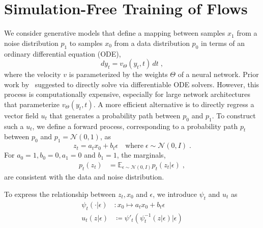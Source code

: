 \section{Simulation-Free Training of Flows}
\label{sec:method}

%
%
%
We consider generative models that define a mapping between samples $x_1$ from a
noise distribution $p_1$ to samples $x_0$ from a data distribution $p_0$ in
terms of an ordinary differential equation (ODE),
\begin{equation}
  \label{eq:ode}
  dy_t = v_\Theta(y_t, t)\,dt\;,
\end{equation}
where the velocity $v$ is parameterized by the weights $\Theta$ of a neural network.
Prior work by~\citet{Chen2018NeuralOD} suggested to directly solve  via differentiable ODE solvers. However, this process is computationally expensive, especially for large network architectures that parameterize $v_\Theta(y_t, t)$. 
A more efficient alternative is to directly regress a vector field $u_t$ that generates a probability path between $p_0$ and $p_1$.
%
To construct such a $u_t$, we define a forward process, corresponding to a probability path $p_t$ between $p_0$ and $p_1=\mathcal{N}(0, 1)$, as
%
%
\begin{equation}
  \label{eq:forwardprocess}
  z_t = a_t x_0 + b_t \epsilon\quad\text{where}\;\epsilon \sim \mathcal{N}(0,I)\;. 
\end{equation}
For $a_0 = 1, b_0 = 0, a_1 = 0$ and $b_1 = 1$, the marginals,
\begin{align}
  \label{eq:marginals}
  p_t(z_t) &=
  \mathbb{E}_{\epsilon \sim \mathcal{N}(0,I)}
  p_t(z_t \vert \epsilon)\;,
\end{align}
are consistent with the data and noise distribution.

To express the relationship between $z_t, x_0$ and $\epsilon$, we introduce
%
$\psi_t$ and $u_t$ as 
\begin{align}
      \psi_t(\cdot | \epsilon) &: x_0 \mapsto a_t x_0 + b_t \epsilon \\
        u_t(z| \epsilon) &\coloneqq \psi'_t(\psi_t^{-1}(z| \epsilon)  \vert \epsilon) \label{eq:utmapsdiffinverse}
\end{align}

